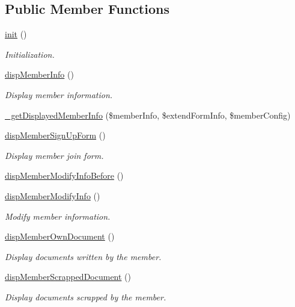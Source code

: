\subsection*{Public Member Functions}
\begin{DoxyCompactItemize}
\item 
\hyperlink{classmemberView_a966e235b7cf76bcdddf07e601d7812b3}{init} ()
\begin{DoxyCompactList}\small\item\em Initialization. \end{DoxyCompactList}\item 
\hyperlink{classmemberView_a81e424307992bdf56ca588e8d1a84995}{disp\+Member\+Info} ()
\begin{DoxyCompactList}\small\item\em Display member information. \end{DoxyCompactList}\item 
\hyperlink{classmemberView_a9b11671586d77aa5f8ee59f3ff96ed1e}{\+\_\+get\+Displayed\+Member\+Info} (\$member\+Info, \$extend\+Form\+Info, \$member\+Config)
\item 
\hyperlink{classmemberView_a1ebd31e392f344898940c0dc739fa6cb}{disp\+Member\+Sign\+Up\+Form} ()
\begin{DoxyCompactList}\small\item\em Display member join form. \end{DoxyCompactList}\item 
\hyperlink{classmemberView_a5cb3b51c7c44b99bd37734fc053a06e4}{disp\+Member\+Modify\+Info\+Before} ()
\item 
\hyperlink{classmemberView_a8636a54e610e74b3d5fffa3611589d89}{disp\+Member\+Modify\+Info} ()
\begin{DoxyCompactList}\small\item\em Modify member information. \end{DoxyCompactList}\item 
\hyperlink{classmemberView_a8c235800dc5fc7484694b852cf7119c6}{disp\+Member\+Own\+Document} ()
\begin{DoxyCompactList}\small\item\em Display documents written by the member. \end{DoxyCompactList}\item 
\hyperlink{classmemberView_a3f2cb0686636f31174aeba8e2e048816}{disp\+Member\+Scrapped\+Document} ()
\begin{DoxyCompactList}\small\item\em Display documents scrapped by the member. \end{DoxyCompactList}\item 

\end{DoxyCompactItemize}
